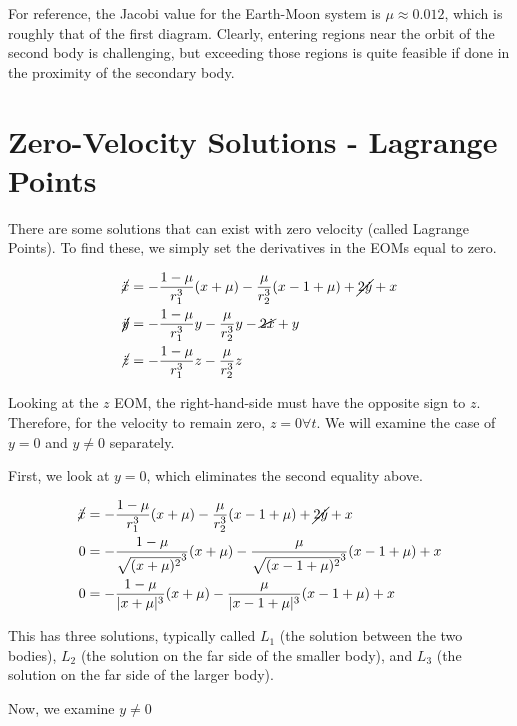 \documentclass{article}
\begin{document}
For reference, the Jacobi value for the Earth-Moon system is $\mu\approx0.012$, which is roughly that of the first diagram. Clearly, entering regions near the orbit of the second body is challenging, but exceeding those regions is quite feasible if done in the proximity of the secondary body.

\section*{Zero-Velocity Solutions - Lagrange Points}

There are some solutions that can exist with zero velocity (called Lagrange Points). To find these, we simply set the derivatives in the EOMs equal to zero.

\[\begin{aligned}
    \cancel{\ddot{x}}&=-\frac{1-\mu}{r_1^3}(x+\mu)-\frac{\mu}{r_2^3}(x-1+\mu)+\cancel{2\dot{y}}+x\\
    \cancel{\ddot{y}}&=-\frac{1-\mu}{r_1^3}y-\frac{\mu}{r_2^3}y-\cancel{2\dot{x}}+y\\
    \cancel{\ddot{z}}&=-\frac{1-\mu}{r_1^3}z-\frac{\mu}{r_2^3}z
\end{aligned}\]

Looking at the $z$ EOM, the right-hand-side must have the opposite sign to $z$. Therefore, for the velocity to remain zero, $z=0\forall t$. We will examine the case of $y=0$ and $y\ne0$ separately.

First, we look at $y=0$, which eliminates the second equality above.

\[\begin{aligned}
    \cancel{\ddot{x}}&=-\frac{1-\mu}{r_1^3}(x+\mu)-\frac{\mu}{r_2^3}(x-1+\mu)+\cancel{2\dot{y}}+x\\
    0&=-\frac{1-\mu}{\sqrt{(x+\mu)^2}^3}(x+\mu)-\frac{\mu}{\sqrt{(x-1+\mu)^2}^3}(x-1+\mu)+x\\
    0&=-\frac{1-\mu}{|x+\mu|^3}(x+\mu)-\frac{\mu}{|x-1+\mu|^3}(x-1+\mu)+x
\end{aligned}\]

This has three solutions, typically called $L_1$ (the solution between the two bodies), $L_2$ (the solution on the far side of the smaller body), and $L_3$ (the solution on the far side of the larger body).

Now, we examine $y\ne0$
\end{document}

